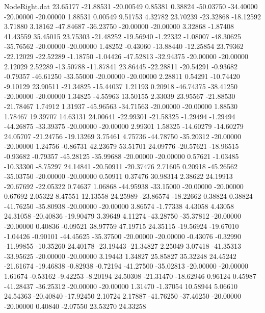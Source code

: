 \begin{filecontents}{NodeRight.dat}
  23.65177  -21.88531  -20.00549     0.85381    0.38824  -50.03750  -34.40000  -20.00000  -20.00000    1.88531    0.00549    9.51753    4.32782
  23.70239  -23.32868  -18.12592     3.71880    3.18162  -47.84687  -36.23750  -20.00000  -20.00000    3.32868   -1.87408   41.43559   35.45015
  23.75303  -21.48252  -19.56940    -1.22332   -1.08007  -48.30625  -35.76562  -20.00000  -20.00000    1.48252   -0.43060  -13.88440  -12.25854
  23.79362  -22.12029  -22.52289    -1.18750   -1.04426  -47.52813  -32.94375  -20.00000  -20.00000    2.12029    2.52289  -13.50788  -11.87841
  23.86445  -22.28811  -20.54291    -0.93682   -0.79357  -46.61250  -33.55000  -20.00000  -20.00000    2.28811    0.54291  -10.74420   -9.10129
  23.90511  -21.34825  -15.44037     1.21193    0.20918  -46.74375  -38.41250  -20.00000  -20.00000    1.34825   -4.55963   13.50155    2.33039
  23.95567  -21.88530  -21.78467     1.74912    1.31937  -45.96563  -34.71563  -20.00000  -20.00000    1.88530    1.78467   19.39707   14.63131
  24.00641  -22.99301  -21.58325    -1.29494   -1.29494  -44.26875  -33.39375  -20.00000  -20.00000    2.99301    1.58325  -14.60279  -14.60279
  24.05707  -21.24756  -19.13269     3.75461    4.75736  -44.78750  -35.20312  -20.00000  -20.00000    1.24756   -0.86731   42.23679   53.51701
  24.09776  -20.57621  -18.96515    -0.93682   -0.79357  -45.28125  -35.99688  -20.00000  -20.00000    0.57621   -1.03485  -10.33300   -8.75297
  24.14841  -20.50911  -20.37476     2.71605    0.20918  -45.26562  -35.03750  -20.00000  -20.00000    0.50911    0.37476   30.98314    2.38622
  24.19913  -20.67692  -22.05322     0.74637    1.06868  -44.95938  -33.15000  -20.00000  -20.00000    0.67692    2.05322    8.47551   12.13558
  24.25989  -23.86574  -18.22662     0.38824    0.38824  -41.76250  -35.80938  -20.00000  -20.00000    3.86574   -1.77338    4.43058    4.43058
  24.31058  -20.40836  -19.90479     3.39649    4.11274  -43.28750  -35.37812  -20.00000  -20.00000    0.40836   -0.09521   38.97759   47.19715
  24.35115  -19.56924  -19.67010    -1.04426   -0.90101  -44.45625  -35.37500  -20.00000  -20.00000   -0.43076   -0.32990  -11.99855  -10.35260
  24.40178  -23.19443  -21.34827     2.25049    3.07418  -41.35313  -33.95625  -20.00000  -20.00000    3.19443    1.34827   25.85827   35.32248
  24.45242  -21.61674  -19.46838    -0.82938   -0.72194  -41.27500  -35.02813  -20.00000  -20.00000    1.61674   -0.53162   -9.42253   -8.20194
  24.50308  -21.31470  -18.62946     0.96124    0.45987  -41.28437  -36.25312  -20.00000  -20.00000    1.31470   -1.37054   10.58944    5.06610
  24.54363  -20.40840  -17.92450     2.10724    2.17887  -41.76250  -37.46250  -20.00000  -20.00000    0.40840   -2.07550   23.53270   24.33258

\end{filecontents}
